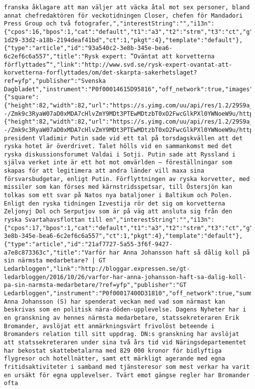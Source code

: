 \begin{verbatim}
franska åklagare att man väljer att väcka åtal mot sex personer, bland annat chefredaktören för veckotidningen Closer, chefen för Mandadori Press Group och två fotografer,","interestString":"","i13n":{"cpos":16,"bpos":1,"cat":"default","t1":"a3","t2":"strm","t3":"ct","g":"6cf9d2aa-1d29-33d2-a18b-2194deaf41bd","ct":1,"pkgt":4},"template":"default"},{"type":"article","id":"93a540c2-3e8b-345e-bea6-6c2ef6c6a557","title":"Rysk expert: ”Oväntat att korvetterna förflyttades”","link":"http://www.svd.se/rysk-expert-ovantat-att-korvetterna-forflyttades/om/det-skarpta-sakerhetslaget?ref=yfp","publisher":"Svenska Dagbladet","instrument":"P0f00014615D95816","off_network":true,"images":{"square":{"height":82,"width":82,"url":"https://s.yimg.com/uu/api/res/1.2/29S9a_0CGlE.Rx_Fqan0_Q--/Zmk9c3RyaW07aD0xMDA7cHlvZmY9MDt3PTEwMDtzbT0xO2FwcGlkPXl0YWNoeW9u/http://slingstone.zenfs.com/offnetwork/c428f358bcce1a742559f647934e49ab","defer":1}},"image":{"height":82,"width":82,"url":"https://s.yimg.com/uu/api/res/1.2/29S9a_0CGlE.Rx_Fqan0_Q--/Zmk9c3RyaW07aD0xMDA7cHlvZmY9MDt3PTEwMDtzbT0xO2FwcGlkPXl0YWNoeW9u/http://slingstone.zenfs.com/offnetwork/c428f358bcce1a742559f647934e49ab","defer":1},"summary":"Rysslands president Vladimir Putin sade vid ett tal på torsdagskvällen att det ryska hotet är överdrivet. Talet hölls vid en sammankomst med det ryska diskussionsforumet Valdai i Sotji. Putin sade att Ryssland i själva verket inte är ett hot mot omvärlden – föreställningar som skapas för att legitimera att andra länder vill maxa sina försvarsbudgetar, enligt Putin. Förflyttningen av ryska korvetter, med missiler som kan förses med kärnstridsspetsar, till Östersjön kan tolkas som ett svar på Natos nya bataljoner i Baltikum och Polen. Enligt den ryska tidningen Izvestija rör det sig om korvetterna Zeljonyj Dol och Serputjov som är på väg att ansluta sig från den ryska Svartahavsflottan till en","interestString":"","i13n":{"cpos":17,"bpos":1,"cat":"default","t1":"a3","t2":"strm","t3":"ct","g":"93a540c2-3e8b-345e-bea6-6c2ef6c6a557","ct":1,"pkgt":4},"template":"default"},{"type":"article","id":"21af7727-5a55-3f6f-9427-a7e8c873363c","title":"Varför har Anna Johansson haft så dålig koll på sin närmsta medarbetare? | GT Ledarbloggen","link":"http://bloggar.expressen.se/gt-ledarbloggen/2016/10/26/varfor-har-anna-johansson-haft-sa-dalig-koll-pa-sin-narmsta-medarbetare/?ref=yfp","publisher":"GT Ledarbloggen","instrument":"P0f00017400D31810","off_network":true,"summary":"Infrastrukturminister Anna Johansson (S) har spenderat veckan med vad som närmast kan beskrivas som en politisk nära-döden-upplevelse. Dagens Nyheter har i en granskning av hennes närmsta medarbetare, statssekreteraren Erik Bromander, avslöjat ett anmärkningsvärt frivolöst beteende i Bromanders relation till sitt uppdrag. DN:s granskning har avslöjat att statssekreteraren under sina två års tid vid Näringsdepartementet har bekostat skattebetalarna med 829 000 kronor för bidlyftiga flygresor och hotellnätter, samt ett märkligt agerande med egna fritidsaktiviteter i samband med tjänsteresor som mest verkar ha varit en ursäkt för egna upplevelser. Tvärt emot gängse regler har Bromander ofta 
\end{verbatim}

